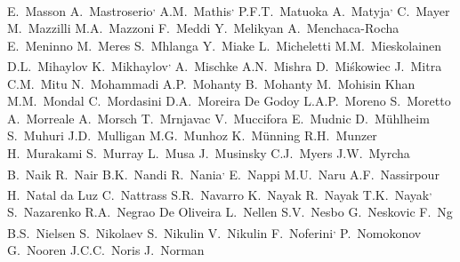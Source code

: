 \begin{flushleft}
E.~Masson\And 
A.~Mastroserio\textsuperscript{,}\And 
A.M.~Mathis\textsuperscript{,}\And 
P.F.T.~Matuoka\And 
A.~Matyja\textsuperscript{,}\And 
C.~Mayer\And 
M.~Mazzilli\And 
M.A.~Mazzoni\And 
F.~Meddi\And 
Y.~Melikyan\And 
A.~Menchaca-Rocha\And 
E.~Meninno\And 
M.~Meres\And 
S.~Mhlanga\And 
Y.~Miake\And 
L.~Micheletti\And 
M.M.~Mieskolainen\And 
D.L.~Mihaylov\And 
K.~Mikhaylov\textsuperscript{,}\And 
A.~Mischke\And 
A.N.~Mishra\And 
D.~Mi\'{s}kowiec\And 
J.~Mitra\And 
C.M.~Mitu\And 
N.~Mohammadi\And 
A.P.~Mohanty\And 
B.~Mohanty\And 
M.~Mohisin Khan\And 
M.M.~Mondal\And 
C.~Mordasini\And 
D.A.~Moreira De Godoy\And 
L.A.P.~Moreno\And 
S.~Moretto\And 
A.~Morreale\And 
A.~Morsch\And 
T.~Mrnjavac\And 
V.~Muccifora\And 
E.~Mudnic\And 
D.~M{\"u}hlheim\And 
S.~Muhuri\And 
J.D.~Mulligan\And 
M.G.~Munhoz\And 
K.~M\"{u}nning\And 
R.H.~Munzer\And 
H.~Murakami\And 
S.~Murray\And 
L.~Musa\And 
J.~Musinsky\And 
C.J.~Myers\And 
J.W.~Myrcha\And 
B.~Naik\And 
R.~Nair\And 
B.K.~Nandi\And 
R.~Nania\textsuperscript{,}\And 
E.~Nappi\And 
M.U.~Naru\And 
A.F.~Nassirpour\And 
H.~Natal da Luz\And 
C.~Nattrass\And 
S.R.~Navarro\And 
K.~Nayak\And 
R.~Nayak\And 
T.K.~Nayak\textsuperscript{,}\And 
S.~Nazarenko\And 
R.A.~Negrao De Oliveira\And 
L.~Nellen\And 
S.V.~Nesbo\And 
G.~Neskovic\And 
F.~Ng\And 
B.S.~Nielsen\And 
S.~Nikolaev\And 
S.~Nikulin\And 
V.~Nikulin\And 
F.~Noferini\textsuperscript{,}\And 
P.~Nomokonov\And 
G.~Nooren\And 
J.C.C.~Noris\And 
J.~Norman\And 

\end{flushleft}
